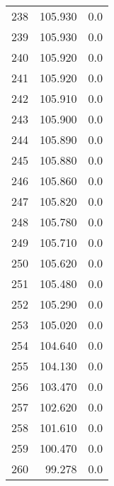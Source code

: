 \begin{tabular}{lrr}
238 &  105.930 &   0.0 \\
239 &  105.930 &   0.0 \\
240 &  105.920 &   0.0 \\
241 &  105.920 &   0.0 \\
242 &  105.910 &   0.0 \\
243 &  105.900 &   0.0 \\
244 &  105.890 &   0.0 \\
245 &  105.880 &   0.0 \\
246 &  105.860 &   0.0 \\
247 &  105.820 &   0.0 \\
248 &  105.780 &   0.0 \\
249 &  105.710 &   0.0 \\
250 &  105.620 &   0.0 \\
251 &  105.480 &   0.0 \\
252 &  105.290 &   0.0 \\
253 &  105.020 &   0.0 \\
254 &  104.640 &   0.0 \\
255 &  104.130 &   0.0 \\
256 &  103.470 &   0.0 \\
257 &  102.620 &   0.0 \\
258 &  101.610 &   0.0 \\
259 &  100.470 &   0.0 \\
260 &   99.278 &   0.0 \\
\bottomrule
\end{tabular}
